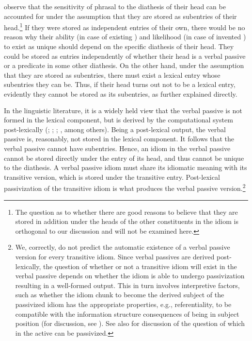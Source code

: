 \documentclass[output=paper]{langsci/langscibook}
\begin{document}
\textcite{HorSil2009,HorSil2019} observe that the sensitivity of 
phrasal  to the diathesis of their head can be accounted for under the
assumption that they are stored as subentries of their head.\footnote{
    \textrm{The question as to whether there are good reasons to believe that
        they are stored in addition under the heads of the other constituents
in the idiom is orthogonal to our discussion and will not be examined here.} }
If they were stored as independent entries of their own, there would be no
reason why their ability (in case of existing ) and likelihood (in case
of invented ) to exist as unique  should depend on the specific
diathesis of their head. They could be stored as entries independently of
whether their head is a verbal passive or a predicate in some other diathesis.
On the other hand, under the assumption that they are stored as subentries,
there must exist a lexical entry whose subentries they can be. Thus, if their
head turns out not to be a lexical entry, evidently they cannot be stored as
its subentries, as further explained directly.

In the linguistic literature, it is a widely held view that the verbal passive
is not formed in the lexical component, but is derived by the computational
system post-lexically (\citealt{BakJohRob1989}; \citealt{Collins2005};
\citealt{HorSil2008}; \citealt{Meltzer-Asscher2012}, among others).
Being a post-lexical output, the verbal passive is, reasonably, not stored in
the lexical component. It follows that the verbal passive cannot have
subentries. Hence, an idiom in the verbal passive cannot be stored directly
under the entry of its head, and thus cannot be unique to the diathesis. A
verbal passive idiom must share its idiomatic meaning with its transitive
version, which is stored under the transitive entry. Post-lexical passivization
of the transitive idiom is what produces the verbal passive
version.\footnote{We, correctly, do not predict the automatic existence of a
    verbal passive version for every transitive idiom. Since verbal passives
    are derived post-lexically, the question of whether or not a transitive
    idiom will exist in the verbal passive depends on whether the
    idiom is able to undergo passivization resulting in a
    well-formed output.  This in turn involves interpretive factors, such as
    whether the idiom chunk to become the derived subject of the
    passivized idiom has the appropriate properties, e.g.,
    referentiality, to be compatible with the information structure
consequences of being in subject position (for discussion, see
\citealt{Ruwet1991}). See also \citet{NunSagWas1994} for discussion of the
question of which  in the active can be passivized.}
\end{document}
